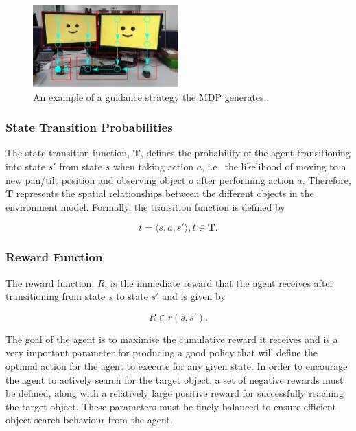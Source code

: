 \documentclass[a4paper, twoside]{article}
\begin{document}
\begin{figure}
  \centering
  \includegraphics[width=0.5\textwidth]{figures/office_desk_example.png}
  \caption{An example of a guidance strategy the MDP generates. }\label{fig:route-example}
\end{figure}

\subsubsection{State Transition Probabilities}

\noindent The state transition function, $\mathbf{T}$, defines the probability of the agent transitioning into state $s'$ from state $s$ when taking action $a$, i.e.\ the likelihood of moving to a new pan/tilt position and observing object $o$ after performing action $a$. Therefore, $\mathbf{T}$ represents the spatial relationships between the different objects in the environment model. Formally, the transition function is defined by

\begin{equation}
  t=\langle{}s, a, s'\rangle, t\in{}\mathbf{T}.
\end{equation}

\subsubsection{Reward Function}

\noindent The reward function, $R$, is the immediate reward that the agent receives after transitioning from state $s$ to state $s'$ and is given by 

\begin{equation}
  R\in r(s, s').
\end{equation} 

The goal of the agent is to maximise the cumulative reward it receives and is a very important parameter for producing a good policy that will define the optimal action for the agent to execute for any given state. In order to encourage the agent to actively search for the target object, a set of negative rewards must be defined, along with a relatively large positive reward for successfully reaching the target object. These parameters must be finely balanced to ensure efficient object search behaviour from the agent.
\end{document}

